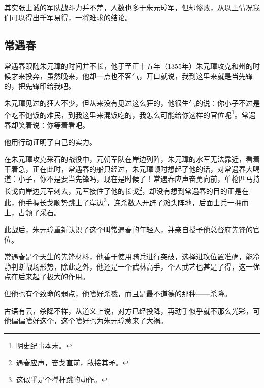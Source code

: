 \begin{multicols}{\theparacolNo}
		其实张士诚的军队战斗力并不差，人数也多于朱元璋军，但却惨败，从以上情况我们可以得出千军易得，一将难求的结论。

		\subsection{常遇春}
		常遇春跟随朱元璋的时间并不长，他于至正十五年（1355年）朱元璋攻克和州的时候才来投奔，虽然晚来，他却一点也不客气，开口就说，我到这里来就是当先锋的，把先锋印给我吧。

		朱元璋见过的狂人不少，但从来没有见过这么狂的，他很生气的说：你小子不过是个吃不饱饭的难民，到我这里来混饭吃的，我怎么可能给你这样的官位呢\footnote{明史纪事本末。}。常遇春却笑着说：你等着看吧。

		他用行动证明了自己的实力。

		在朱元璋攻克采石的战役中，元朝军队在岸边列阵，朱元璋的水军无法靠近，看着干着急，正在此时，常遇春的船只经过，朱元璋顿时想起了他的话，对常遇春大喝道：小子，你不是要当先锋吗，现在是时候了！常遇春应声奋勇向前，单枪匹马持长戈向岸边元军刺去，元军接住了他的长戈\footnote{遇春应声，奋戈直前，敌接其矛。}，却没有想到常遇春的目的正是在此，他手握长戈顺势跳上了岸边\footnote{这似乎是个撑杆跳的动作。}，连杀数人开辟了滩头阵地，后面士兵一拥而上，占领了采石。

		此战后，朱元璋重新认识了这个叫常遇春的年轻人，并亲自授予他总督府先锋的官位。

		常遇春是个天生的先锋材料，他善于使用骑兵进行突破，选择进攻位置准确，能冷静判断战场形势，除此之外，他还是一个武林高手，个人武艺也甚是了得，这一优点在后来起了极大的作用。

		但他也有个致命的弱点，他嗜好杀戮，而且是最不道德的那种——杀降。

		古语有云，杀降不祥，从道义上说，对方已经投降，再动手似乎就不那么光彩，可他偏偏嗜好这个，这个嗜好也为朱元璋惹来了大祸。
		\ifnum{}
	\end{multicols}
\fi
\newpage
